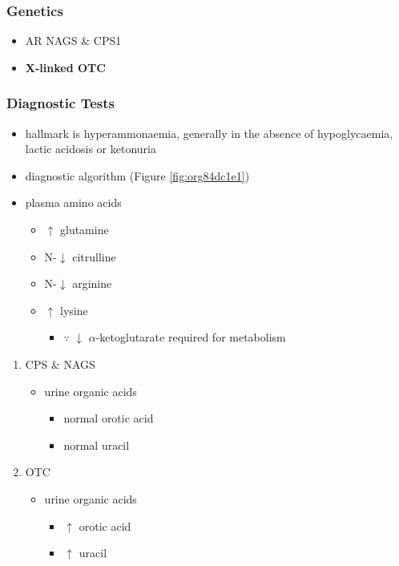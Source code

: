 \documentclass{scrartcl}
\begin{document}
\subsubsection{Genetics}
\label{sec:org72ee946}
\begin{itemize}
\item AR NAGS \& CPS1
\item \textbf{X-linked OTC}
\end{itemize}

\subsubsection{Diagnostic Tests}
\label{sec:org20e57b6}
\begin{itemize}
\item hallmark is hyperammonaemia, generally in the absence of
hypoglycaemia, lactic acidosis or ketonuria
\item diagnostic algorithm (Figure \ref{fig:org84dc1e1})
\item plasma amino acids
\begin{itemize}
\item \(\uparrow\) glutamine
\item N-\(\downarrow\) citrulline
\item N-\(\downarrow\) arginine
\item \(\uparrow\) lysine
\begin{itemize}
\item \(\because\) \(\downarrow\) \(\alpha\)-ketoglutarate required for metabolism
\end{itemize}
\end{itemize}
\end{itemize}
\begin{enumerate}
\item CPS \& NAGS
\label{sec:orga4699aa}
\begin{itemize}
\item urine organic acids
\begin{itemize}
\item normal orotic acid
\item normal uracil
\end{itemize}
\end{itemize}
\item OTC
\label{sec:org109bc7b}
\begin{itemize}
\item urine organic acids
\begin{itemize}
\item \(\uparrow\) orotic acid
\item \(\uparrow\) uracil
\end{itemize}
\end{itemize}
\end{enumerate}
\end{document}
